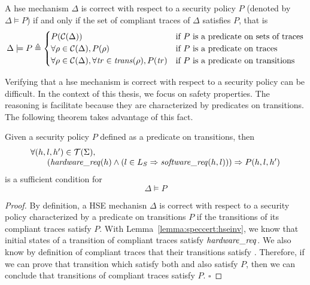 \begin{definition}
  A \ac{hse} mechanism $\Delta$ is correct with respect to a security policy $P$
  (denoted by $\Delta \models P$) if and only if the set of compliant traces of
  $\Delta$ satisfies $P$, that is
  \[
    \Delta \models P \triangleq
    \begin{cases}
      P(\mathcal{C}(\Delta)) & \text{if } P \text{ is a predicate on sets of
        traces} \\
      \forall \rho \in \mathcal{C}(\Delta), P(\rho) & \text{if } P \text{ is a
        predicate on traces} \\
      \forall \rho \in \mathcal{C}(\Delta), \forall \mathit{tr} \in
      \mathit{trans}(\rho), P(\mathit{tr}) & \text{if }P \text{ is a predicate on
        transitions}
    \end{cases}
  \]
\end{definition}

%
Verifying that a \ac{hse} mechanism is correct with respect to a security policy
can be difficult.
%
In the context of this thesis, we focus on safety properties. 
%
The reasoning is facilitate because they are characterized by predicates on
transitions.
%
The following theorem takes advantage of this fact.

\begin{theorem}
  \label{theorem:speccert:correcthse}
  Given a security policy $P$ defined as a predicate on transitions, then
  \[
    \begin{array}{l}
      \forall (h, l, h') \in \mathcal{T}(\Sigma), \\
      \qquad (\mathit{hardware\_req}(h) \wedge
      (l \in L_{S} \Rightarrow \mathit{software\_req}(h, l)))
      \Rightarrow P(h, l, h')
    \end{array}
  \]
  is a sufficient condition for
  \[
    \Delta \models P
  \]

  \begin{proof}
    By definition, a HSE mechanisn \( \Delta \) is correct with respect to a
    security policy characterized by a predicate on transitions \( P \) if the
    transitions of its compliant traces satisfy \( P \).
    With Lemma~\ref{lemma:speccert:hseinv}, we know that initial states of a
    transition of compliant traces satisfy $\mathit{hardware\_req}$.
    We also know by definition of compliant traces that their transitions
    satisfy .
    Therefore, if we can prove that transition which satisfy both
     and  also satisfy \( P \), then we
    can conclude that transitions of compliant traces satisfy \( P \).
    \hfill \( \square \)
  \end{proof}
\end{theorem}

